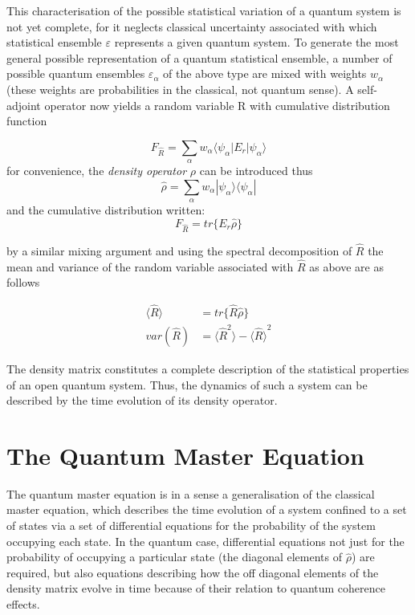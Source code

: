 \documentclass[reqno]{amsart}
\newcommand{\dens}{\hat{\rho}}
\begin{document}
This characterisation of the possible statistical variation of a quantum system is not yet complete, for it neglects classical uncertainty associated with which statistical ensemble $\varepsilon$ represents a given quantum system. To generate the most general possible representation of a quantum statistical ensemble, a number of possible quantum ensembles $\varepsilon_\alpha$ of the above type are mixed with weights $w_\alpha$ (these weights are probabilities in the classical, not quantum sense). A self-adjoint operator now yields a random variable R with cumulative distribution function 

\begin{equation}
	F_{\hat{R}} = \sum_\alpha w_\alpha \langle \psi_\alpha | E_r | \psi_\alpha \rangle
\end{equation}
for convenience, the \emph{density operator} $\rho$ can be introduced thus
\begin{equation}
	\dens = \sum_\alpha w_\alpha |\psi_\alpha \rangle \langle \psi_\alpha |
\end{equation}
and the cumulative distribution written:
\begin{equation}
	F_{\hat{R}} = tr\{E_r \dens\}
\end{equation}

by a similar mixing argument and using the spectral decomposition of $\hat{R}$ the mean and variance of the random variable associated with $\hat{R}$ as above are as follows

\begin{align}
	\langle \hat{R} \rangle &= tr\{\hat{R} \dens\} \\
	var(\hat{R}) &= \langle \hat{R}^2 \rangle - {\langle \hat{R} \rangle}^2
\end{align}

The density matrix constitutes a complete description of the statistical properties of an open quantum system. Thus, the dynamics of such a system can be described by the time evolution of its density operator.


\section{The Quantum Master Equation}
The quantum master equation is in a sense a generalisation of the classical master equation, which describes the time evolution of a system confined to a set of states via a set of differential equations for the probability of the system occupying each state. In the quantum case, differential equations not just for the probability of occupying a particular state (the diagonal elements of $\dens$) are required, but also equations describing how the off diagonal elements of the density matrix evolve in time because of their relation to quantum coherence effects.
\end{document}
